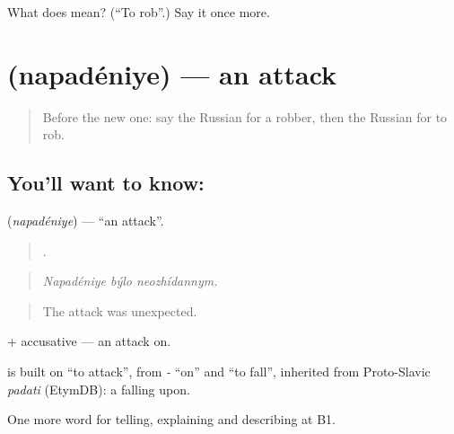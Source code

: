 \begin{tcolorbox}[breakable,colback=teal!4,colframe=teal!35!black,title={Before you move on}]
What does  mean? (\textquotedblleft{}To rob\textquotedblright{}.) Say it once more.
\end{tcolorbox}
\section[\texorpdfstring{\ru{нападение} (napadéniye)}{нападение (napadéniye)}]{ (napadéniye) — an attack}

\label{lesson:RU-C289-napadeniye}



\begin{quote}
Before the new one: say the Russian for a robber, then the Russian for to rob.
\end{quote}

\subsection*{You'll want to know: }
\textbf{} (\emph{napadéniye}) — \textquotedblleft{}an attack\textquotedblright{}.

\begin{quote}
  .
\end{quote}

\begin{quote}
\emph{Napadéniye býlo neozhídannym.}
\end{quote}

\begin{quote}
The attack was unexpected.
\end{quote}

\emph{ } + accusative — an attack on.

\begin{cousinweb}
\emph{} is built on \emph{} \textquotedblleft{}to attack\textquotedblright{}, from \emph{-} \textquotedblleft{}on\textquotedblright{} and \emph{} \textquotedblleft{}to fall\textquotedblright{}, inherited from Proto-Slavic \emph{padati} (EtymDB): a falling upon.
\end{cousinweb}

\begin{grammarlens}[title={What you've built}]
One more word for telling, explaining and describing at B1.
\end{grammarlens}


